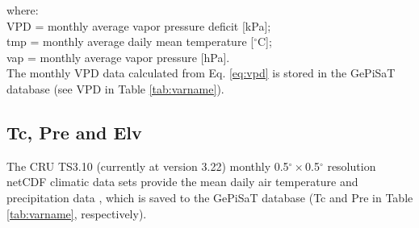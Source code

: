 \noindent where:\\
\indent VPD = monthly average vapor pressure deficit [kPa];\\
\indent tmp = monthly average daily mean temperature [$^{\circ}$C];\\
\indent vap = monthly average vapor pressure [hPa].\\

The monthly VPD data calculated from Eq. \ref{eq:vpd} is stored in the GePiSaT database (see VPD in Table \ref{tab:varname}).

\subsection{Tc, Pre and Elv}
\label{sec:gepcru}
The CRU TS3.10 (currently at version 3.22) monthly 0.5$^{\circ}\times$0.5$^{\circ}$ resolution netCDF climatic data sets provide the mean daily air temperature and precipitation data \parencite{harris14}, which is saved to the GePiSaT database (Tc and Pre in Table \ref{tab:varname}, respectively).

